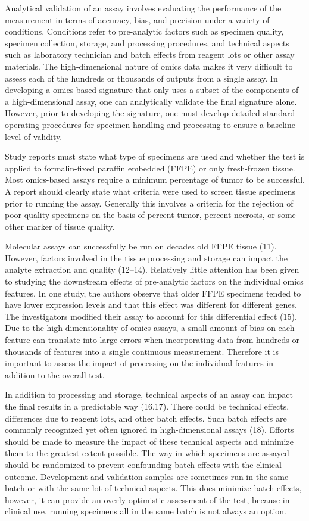 \documentclass[11pt]{article}
\begin{document}
Analytical validation of an assay involves evaluating the performance of
the measurement in terms of accuracy, bias, and precision under a
variety of conditions. Conditions refer to pre-analytic factors such as
specimen quality, specimen collection, storage, and processing
procedures, and technical aspects such as laboratory technician and
batch effects from reagent lots or other assay materials. The
high-dimensional nature of omics data makes it very difficult to assess
each of the hundreds or thousands of outputs from a single assay. In
developing a omics-based signature that only uses a subset of the
components of a high-dimensional assay, one can analytically validate
the final signature alone. However, prior to developing the signature,
one must develop detailed standard operating procedures for specimen
handling and processing to ensure a baseline level of validity.

Study reports must state what type of specimens are used and whether the
test is applied to formalin-fixed paraffin embedded (FFPE) or only
fresh-frozen tissue. Most omics-based assays require a minimum
percentage of tumor to be successful. A report should clearly state what
criteria were used to screen tissue specimens prior to running the
assay. Generally this involves a criteria for the rejection of
poor-quality specimens on the basis of percent tumor, percent necrosis,
or some other marker of tissue quality.

Molecular assays can successfully be run on decades old FFPE tissue
(11). However, factors involved in the tissue processing and storage can
impact the analyte extraction and quality (12--14). Relatively little
attention has been given to studying the downstream effects of
pre-analytic factors on the individual omics features. In one study, the
authors observe that older FFPE specimens tended to have lower
expression levels and that this effect was different for different
genes. The investigators modified their assay to account for this
differential effect (15). Due to the high dimensionality of omics
assays, a small amount of bias on each feature can translate into large
errors when incorporating data from hundreds or thousands of features
into a single continuous measurement. Therefore it is important to
assess the impact of processing on the individual features in addition
to the overall test.

In addition to processing and storage, technical aspects of an assay can
impact the final results in a predictable way (16,17). There could be
technical effects, differences due to reagent lots, and other batch
effects. Such batch effects are commonly recognized yet often ignored in
high-dimensional assays (18). Efforts should be made to measure the
impact of these technical aspects and minimize them to the greatest
extent possible. The way in which specimens are assayed should be
randomized to prevent confounding batch effects with the clinical
outcome. Development and validation samples are sometimes run in the
same batch or with the same lot of technical aspects. This does minimize
batch effects, however, it can provide an overly optimistic assessment
of the test, because in clinical use, running specimens all in the same
batch is not always an option.
\end{document}
